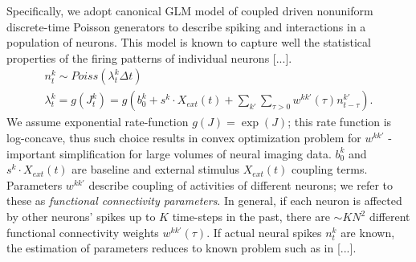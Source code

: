 \documentclass[amsmath,amssymb]{revtex4}
\begin{document}
Specifically, we adopt canonical GLM model of coupled driven nonuniform discrete-time Poisson generators to describe spiking and interactions in a population of neurons. This model is known to capture well the statistical properties of
the firing patterns of individual neurons [...].
\begin{equation}\label{eqn:glm:definition}
\begin{array}{l}
n^k_t\sim Poiss(\lambda^k_t\Delta t) \\
\lambda^k_t=g(J^k_t)=g(b_0^k+s^k\cdot X_{ext}(t)+\sum\limits_{k'} \sum\limits_{\tau>0} w^{kk'}(\tau)n^{k'}_{t-\tau}).
\end{array}
\end{equation}
We assume exponential rate-function $g(J)=\exp(J)$; this rate function is log-concave, thus such choice results in convex optimization problem for $w^{kk'}$ - important simplification for large volumes of neural imaging data.
$b_0^k$ and $s^k\cdot X_{ext}(t)$ are baseline and external stimulus $X_{ext}(t)$ coupling terms. Parameters $w^{kk'}$ describe coupling of activities of different neurons; we refer to these as {\em functional connectivity parameters}. In general, if each neuron is affected by other neurons' spikes up to $K$ time-steps in the past, there are $\sim K N^2$ different functional connectivity weights $w^{kk'}(\tau)$. If actual neural spikes $n^k_t$ are known, the estimation of parameters reduces to known problem such as in [...].
\end{document}
